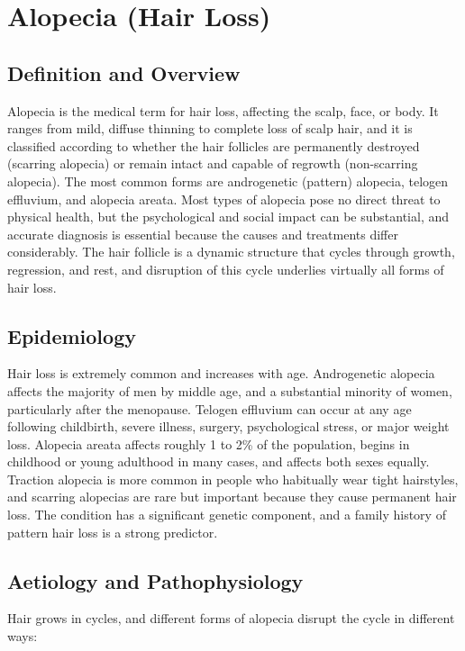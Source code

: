 \chapter{Alopecia (Hair Loss)}

\section*{Definition and Overview}
Alopecia is the medical term for hair loss, affecting the scalp, face, or body. It ranges from mild, diffuse thinning to complete loss of scalp hair, and it is classified according to whether the hair follicles are permanently destroyed (scarring alopecia) or remain intact and capable of regrowth (non-scarring alopecia). The most common forms are androgenetic (pattern) alopecia, telogen effluvium, and alopecia areata. Most types of alopecia pose no direct threat to physical health, but the psychological and social impact can be substantial, and accurate diagnosis is essential because the causes and treatments differ considerably. The hair follicle is a dynamic structure that cycles through growth, regression, and rest, and disruption of this cycle underlies virtually all forms of hair loss.

\section*{Epidemiology}
Hair loss is extremely common and increases with age. Androgenetic alopecia affects the majority of men by middle age, and a substantial minority of women, particularly after the menopause. Telogen effluvium can occur at any age following childbirth, severe illness, surgery, psychological stress, or major weight loss. Alopecia areata affects roughly 1 to 2\% of the population, begins in childhood or young adulthood in many cases, and affects both sexes equally. Traction alopecia is more common in people who habitually wear tight hairstyles, and scarring alopecias are rare but important because they cause permanent hair loss. The condition has a significant genetic component, and a family history of pattern hair loss is a strong predictor.

\section*{Aetiology and Pathophysiology}
Hair grows in cycles, and different forms of alopecia disrupt the cycle in different ways:

